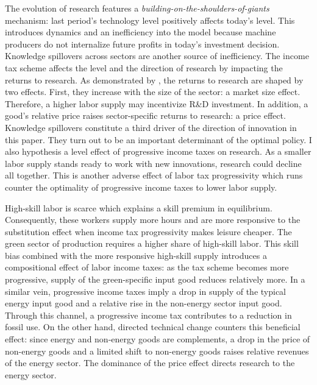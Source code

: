 The evolution of research features a \textit{building-on-the-shoulders-of-giants} mechanism: last period's technology level positively affects today's level. This introduces dynamics and an inefficiency into the model because machine producers do not internalize future profits in today's investment decision. 
Knowledge spillovers across sectors are another source of inefficiency. The income tax scheme affects the level and the direction of research by impacting the returns to research.
As demonstrated by \cite{Acemoglu2002DirectedChange},
the returns to research are shaped by two effects. First, they increase with the size of the sector: a market size effect. Therefore, a higher labor supply may incentivize R\&D investment. In addition, a good's relative price raises sector-specific returns to research: a price effect. Knowledge spillovers constitute a third driver of the direction of innovation in this paper. They turn out to be an important determinant of the optimal policy. 
I also hypothesis a level effect of progressive income taxes on research. As a smaller labor supply stands ready to work with new innovations, research could decline all together. This is another adverse effect of labor tax progressivity which runs counter the optimality of progressive income taxes to lower labor supply.



High-skill labor is scarce which explains a skill premium in equilibrium. Consequently, these workers supply more hours and are more responsive to the substitution effect when income tax progressivity makes leisure cheaper.
The green sector of production requires a higher share of high-skill labor. This skill bias combined with the more responsive high-skill supply introduces a compositional effect of labor income taxes: as the tax scheme becomes more progressive, supply of the green-specific input good reduces relatively more. In a similar vein, progressive income taxes imply a drop in supply of the typical energy input good and a relative rise in the non-energy sector input good. Through this channel, a progressive income tax contributes to a reduction in fossil use. On the other hand, directed technical change counters this beneficial effect: since energy and non-energy goods are complements, a drop in the price of non-energy goods and a limited shift to non-energy goods raises relative revenues of the energy sector. The dominance of the price effect directs research to the energy sector. %

